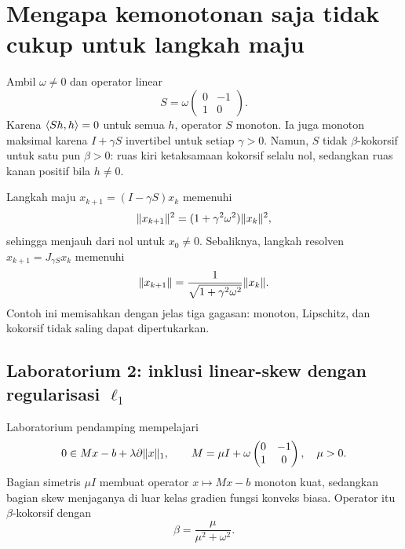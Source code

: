 \section{Mengapa kemonotonan saja tidak cukup untuk langkah maju}
\label{orig02:section:skew}

Ambil $\omega\neq0$ dan operator linear
\begin{equation}
  \label{orig02:eq:skew}
  S=\omega
  \begin{pmatrix}0&-1\\1&0\end{pmatrix}.
\end{equation}
Karena $\left\langle Sh , h\right\rangle=0$ untuk semua $h$, operator $S$ monoton. Ia juga
monoton maksimal karena $I+\gamma S$ invertibel untuk setiap $\gamma>0$.
Namun, $S$ tidak $\beta$-kokorsif untuk satu pun $\beta>0$: ruas kiri
ketaksamaan kokorsif selalu nol, sedangkan ruas kanan positif bila $h\neq0$.

Langkah maju $x_{k+1}=(I-\gamma S)x_k$ memenuhi
\begin{equation}
  \|x_{k+1}\|^2=(1+\gamma^2\omega^2)\|x_k\|^2,
\end{equation}
sehingga menjauh dari nol untuk $x_0\neq0$. Sebaliknya, langkah resolven
$x_{k+1}=J_{\gamma S}x_k$ memenuhi
\begin{equation}
  \|x_{k+1}\|
  =\frac{1}{\sqrt{1+\gamma^2\omega^2}}\|x_k\|.
\end{equation}
Contoh ini memisahkan dengan jelas tiga gagasan: monoton, Lipschitz, dan
kokorsif tidak saling dapat dipertukarkan.

\subsection*{Laboratorium 2: inklusi linear-skew dengan regularisasi $\ell_1$}
\label{orig02:lab:monotone-splitting}

Laboratorium pendamping mempelajari
\begin{equation}
  \label{orig02:eq:lab-inclusion}
  0\in Mx-b+\lambda\partial\|x\|_1,
  \qquad
  M=\mu I+\omega
  \begin{pmatrix}0&-1\\1&0\end{pmatrix},
  \quad \mu>0.
\end{equation}
Bagian simetris $\mu I$ membuat operator $x\mapsto Mx-b$ monoton kuat,
sedangkan bagian skew menjaganya di luar kelas gradien fungsi konveks biasa.
Operator itu $\beta$-kokorsif dengan
\begin{equation}
  \label{orig02:eq:lab-beta}
  \beta=\frac{\mu}{\mu^2+\omega^2}.
\end{equation}

